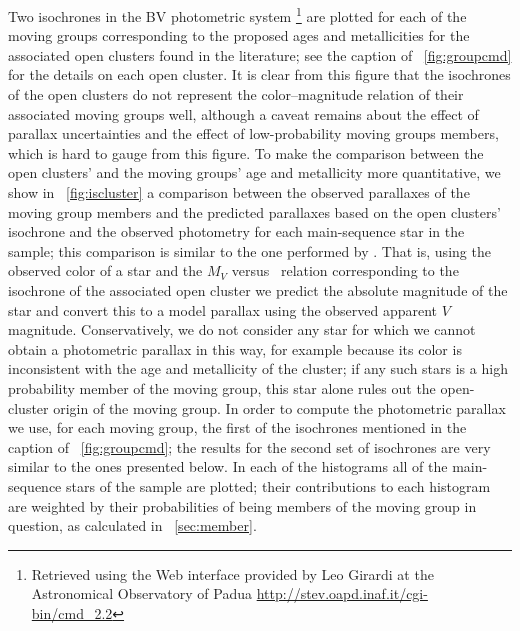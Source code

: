 Two isochrones in the BV photometric system
\citep{Marigo08a,Bertelli94a,Maiz06a}\footnote{Retrieved using the Web
interface provided by Leo Girardi at the Astronomical Observatory of
Padua \url{http://stev.oapd.inaf.it/cgi-bin/cmd_2.2}} are plotted for
each of the moving groups corresponding to the proposed ages and
metallicities for the associated open clusters found in the
literature; see the caption of \figurename~\ref{fig:groupcmd} for the
details on each open cluster. It is clear from this figure that the
isochrones of the open clusters do not represent the color--magnitude
relation of their associated moving groups well, although a caveat
remains about the effect of parallax uncertainties and the effect of
low-probability moving groups members, which is hard to gauge from
this figure. To make the comparison between the open clusters' and the
moving groups' age and metallicity more quantitative, we show in
\figurename~\ref{fig:iscluster} a comparison between the observed
parallaxes of the moving group members and the predicted parallaxes
based on the open clusters' isochrone and the observed photometry for
each main-sequence star in the sample; this comparison is similar to
the one performed by \citet{Famaey08a}. That is, using the observed
color of a star and the $M_V$ versus \bminusv\ relation corresponding
to the isochrone of the associated open cluster we predict the
absolute magnitude of the star and convert this to a model parallax
using the observed apparent $V$ magnitude. Conservatively, we do not
consider any star for which we cannot obtain a photometric parallax in
this way, for example because its color is inconsistent with the age
and metallicity of the cluster; if any such stars is a high
probability member of the moving group, this star alone rules out the
open-cluster origin of the moving group. In order to compute the
photometric parallax we use, for each moving group, the first of the
isochrones mentioned in the caption of \figurename~\ref{fig:groupcmd};
the results for the second set of isochrones are very similar to the
ones presented below. In each of the histograms all of the
main-sequence stars of the sample are plotted; their contributions to
each histogram are weighted by their probabilities of being members of
the moving group in question, as calculated in
\sectionname~\ref{sec:member}.

